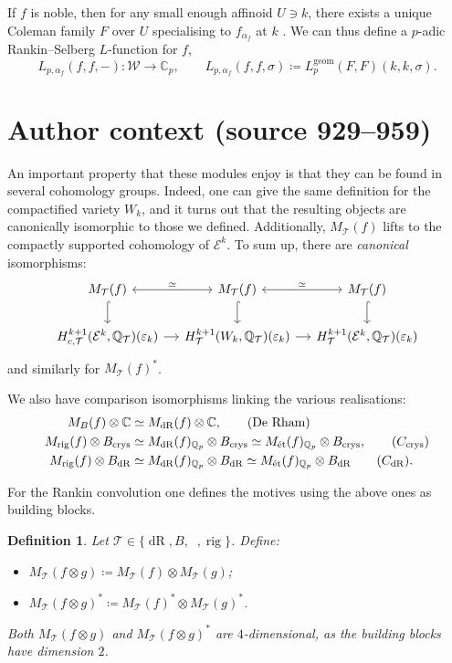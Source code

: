 \documentclass[10pt,a4paper]{amsart}
\newcommand{\Ell}{\mathcal{E}}
\newcommand{\Lgeom}{L_p^{\mathrm{geom}}}
\newcommand{\Bcrys}{B_{\mathrm{crys}}}
\newcommand{\BdR}{B_{\dR}}
\newcommand{\C}{\numberset{C}}
\newcommand{\Q}{\numberset{Q}}
\newcommand{\Weight}{\mathcal{W}}
\DeclareMathOperator{\dR}{dR}
\renewcommand{\epsilon}{\varepsilon}
\DeclareMathOperator{\et}{\acute{e}t}
\DeclareMathOperator{\rig}{rig}
\newcommand{\theory}{\mathcal{T}}
\newcommand{\numberset}{\mathbb}
\newtheorem{definition}{Definition}
\begin{document}
  If $f$ is noble, then for any small enough affinoid $U \ni k$, there exists a unique Coleman family $F$ over $U$ specialising to $f_{\alpha_f}$ at $k$ \cite[Theorem~4.6.4]{loefflerzerbes16}. We can thus define a $p$-adic Rankin--Selberg $L$-function for $f$,
  \[ L_{p, \alpha_f}(f, f, -) : \Weight \to \C_p, \qquad L_{p, \alpha_f}(f, f, \sigma) \coloneqq \Lgeom(F, F)(k, k, \sigma).\]

\section*{Author context (source 929--959)}
  An important property that these modules enjoy is that they can be found in several cohomology groups. Indeed, one can give the same definition for the compactified variety $W_k$, and it turns out that the resulting objects are canonically isomorphic to those we defined. Additionally, $M_{\theory}(f)$ lifts to the compactly supported cohomology of $\Ell^k$. To sum up, there are \emph{canonical} isomorphisms:
  \[
   \begin{tikzcd}[column sep=small]
    M_{\theory}(f) \arrow[<->,"\simeq"]{r} \arrow[hook]{d} &
    M_{\theory}(f) \arrow[<->,"\simeq"]{r} \arrow[hook]{d} &
    M_{\theory}(f) \arrow[hook]{d} \\
    H_{c,\theory}^{k+1}(\Ell^k, \Q_{\theory})(\epsilon_k) \ar[r] &
    H_{\theory}^{k+1}(W_k, \Q_{\theory})(\epsilon_k) \ar[r] &
    H_{\theory}^{k+1}(\Ell^k, \Q_{\theory})(\epsilon_k)
   \end{tikzcd}
  \]
  and similarly for $M_\theory(f)^*$.

  We also have comparison isomorphisms linking the various realisations:
  \begin{align}
   M_B(f) \otimes \C &\simeq M_{\dR}(f) \otimes \C, \tag{De Rham}\\
   M_{\rig}(f) \otimes \Bcrys &\simeq M_{\dR}(f)_{\Q_p} \otimes \Bcrys \simeq M_{\et}(f)_{\Q_p} \otimes \Bcrys, \tag{$C_{\mathrm{crys}}$} \\
   M_{\rig}(f) \otimes \BdR &\simeq M_{\dR}(f)_{\Q_p} \otimes \BdR \simeq M_{\et}(f)_{\Q_p} \otimes \BdR \tag{$C_{\dR}$}.
  \end{align}

  For the Rankin convolution one defines the motives using the above ones as building blocks.
  \begin{definition}
   Let $\theory\in\{\dR,B,\et,\rig\}$. Define:
   \begin{itemize}
    \item $M_{\theory}(f\otimes g) \coloneqq M_{\theory}(f) \otimes M_{\theory}(g)$;
    \item $M_{\theory}(f\otimes g)^* \coloneqq M_{\theory}(f)^* \otimes M_{\theory}(g)^*$.
   \end{itemize}
   Both $M_{\theory}(f\otimes g)$ and $M_{\theory}(f\otimes g)^*$ are $4$-dimensional, as the building blocks have dimension $2$.
  \end{definition}
\end{document}

